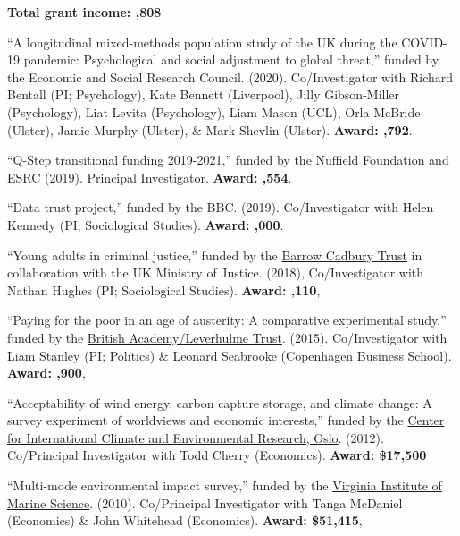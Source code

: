 \documentclass[12pt]{article}
\begin{document}
\begin{bibsection}
	\item \textbf{Total grant income: ,808}

\item ``A longitudinal mixed-methods population study of the UK during the COVID-19 pandemic: Psychological and social adjustment to global threat,'' funded by the Economic and Social Research Council. (2020). Co\-/Investigator with Richard Bentall (PI; Psychology), Kate Bennett (Liverpool), Jilly Gibson-Miller (Psychology), Liat Levita (Psychology), Liam Mason (UCL), Orla McBride (Ulster), Jamie Murphy (Ulster), \& Mark Shevlin (Ulster). \textbf{Award: ,792}. 

	\item ``Q-Step transitional funding 2019-2021,'' funded by the Nuffield Foundation and ESRC (2019).
	Principal Investigator. \textbf{Award: ,554}.

	\item ``Data trust project,'' funded by the BBC. (2019). Co\-/Investigator with 
	Helen Kennedy (PI; Sociological Studies). \textbf{Award: ,000}. 

	\item ``Young adults in criminal justice,'' funded by the 
	\href{https://www.barrowcadbury.org.uk/}{Barrow Cadbury Trust} in collaboration with 
	the UK Ministry of Justice. 
 	(2018), Co\-/Investigator with Nathan Hughes (PI; Sociological Studies). \textbf{Award: ,110}, 

  \item ``Paying for the poor in an age of austerity: 
    A comparative experimental study,'' funded by the \href{http://www.britac.ac.uk/index.cfm}
    {British Academy/Leverhulme Trust}.
   (2015). Co\-/Investigator with Liam Stanley (PI; Politics) \& Leonard 
    Seabrooke (Copenhagen Business School).  \textbf{Award: ,900},
    
     \item ``Acceptability of wind energy, carbon capture storage, 
    and climate change: A survey experiment of worldviews and 
    economic interests,'' funded by 
    the \href{http://www.cicero.uio.no/}
    {Center for International Climate and Environmental Research, Oslo}. 
    (2012). Co\-/Principal Investigator with Todd Cherry (Economics). \textbf{Award: \$17,500}
    
     \item ``Multi-mode environmental impact survey,''
    funded by the \href{http://www.vims.edu/}
    {Virginia Institute of Marine Science}. (2010). Co\-/Principal Investigator with Tanga McDaniel (Economics) \& John Whitehead (Economics). \textbf{Award: \$51,415},


\end{bibsection}
\end{document}
